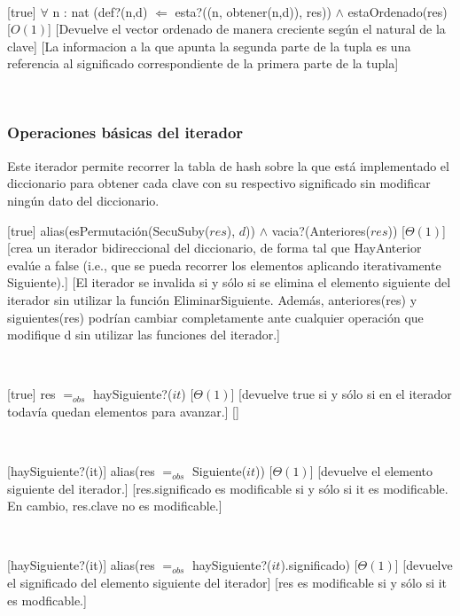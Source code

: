 ~

[true]
{$\forall$ n : nat (def?(n,d) $\Leftarrow$ esta?((n, obtener(n,d)), res)) $\land$ estaOrdenado(res)}
[$O(1)$]
[Devuelve el vector ordenado de manera creciente según el natural de la clave]
[La informacion a la que apunta la segunda parte de la tupla es una referencia al significado correspondiente de la primera parte de la tupla]

~

\subsubsection{Operaciones básicas del iterador}

Este iterador permite recorrer la tabla de hash sobre la que est\'{a} implementado el diccionario para obtener cada clave con su respectivo significado sin modificar ning\'{u}n dato del diccionario.

[true]
{alias(esPermutación(SecuSuby($res$), $d$)) $\land$ vacia?(Anteriores($res$))}
[$\Theta(1)$]
[crea un iterador bidireccional del diccionario, de forma tal que HayAnterior evalúe a false (i.e.,
que se pueda recorrer los elementos aplicando iterativamente Siguiente).]
[El iterador se invalida si y sólo si se elimina el elemento siguiente del iterador sin utilizar la función
EliminarSiguiente. Además, anteriores(res) y siguientes(res) podrían cambiar completamente ante cualquier
operación que modifique d sin utilizar las funciones del iterador.]

~

[true]
{res $=_{obs}$ haySiguiente?($it$)}
[$\Theta(1)$]
[devuelve true si y sólo si en el iterador todavía quedan elementos para avanzar.]
[]

~

[haySiguiente?(it)]
{alias(res $=_{obs}$ Siguiente($it$))}
[$\Theta(1)$]
[devuelve el elemento siguiente del iterador.]
[res.significado es modificable si y sólo si it es modificable. En cambio, res.clave no es modificable.]

~

[haySiguiente?(it)]
{alias(res $=_{obs}$ haySiguiente?($it$).significado)}
[$\Theta(1)$]
[devuelve el significado del elemento siguiente del iterador]
[res es modificable si y sólo si it es modficable.]

